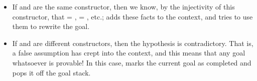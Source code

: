 \documentclass[12pt]{report}
\begin{document}
\begin{itemize}
\item  If  and  are the same constructor, then we know, by the
      injectivity of this constructor, that  = ,  = ,
      etc.;   adds these facts to the context, and tries
      to use them to rewrite the goal.



\item  If  and  are different constructors, then the hypothesis
       is contradictory.  That is, a false assumption has crept
      into the context, and this means that any goal whatsoever is
      provable!  In this case,   marks the current goal as
      completed and pops it off the goal stack. 
\end{itemize}
\end{document}
